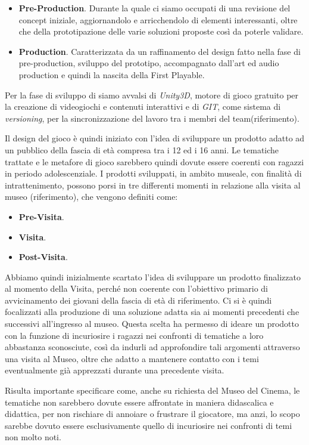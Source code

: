 \begin{itemize}
	\item \textbf{Pre-Production}. Durante la quale ci siamo occupati di una revisione del concept iniziale, aggiornandolo e arricchendolo di elementi interessanti, oltre che della prototipazione delle varie soluzioni proposte così da poterle validare.
	\item \textbf{Production}. Caratterizzata da un raffinamento del design fatto nella fase di pre-production, sviluppo del prototipo, accompagnato dall’art ed audio production e quindi la nascita della First Playable.
\end{itemize}

Per la fase di sviluppo di siamo avvalsi di \textit{Unity3D}, motore di gioco gratuito per la creazione di videogiochi e contenuti interattivi e di \textit{GIT}, come sistema di \textit{versioning}, per la sincronizzazione del lavoro tra i membri del team(riferimento).

Il design del gioco è quindi iniziato con l’idea di sviluppare un prodotto adatto ad un pubblico della fascia di età compresa tra i 12 ed i 16 anni. Le tematiche trattate e le metafore di gioco sarebbero quindi dovute essere coerenti con ragazzi in periodo adolescenziale.
I prodotti sviluppati, in ambito museale, con finalità di intrattenimento, possono porsi in tre differenti momenti in relazione alla visita al museo (riferimento), che vengono definiti come:

\begin{itemize}
	\item \textbf{Pre-Visita}.
	\item \textbf{Visita}.
	\item \textbf{Post-Visita}.
\end{itemize}

Abbiamo quindi inizialmente scartato l’idea di sviluppare un prodotto finalizzato al momento della Visita, perché non coerente con l’obiettivo primario di avvicinamento dei giovani della fascia di età di riferimento. Ci si è quindi focalizzati alla produzione di una soluzione adatta sia ai momenti precedenti che successivi all’ingresso al museo. Questa scelta ha permesso di ideare un prodotto con la funzione di incuriosire i ragazzi nei confronti di tematiche a loro abbastanza sconosciute, così da indurli ad approfondire tali argomenti attraverso una visita al Museo, oltre che adatto a mantenere contatto con i temi eventualmente già apprezzati durante una precedente visita.

Risulta importante specificare come, anche su richiesta del Museo del Cinema, le tematiche non sarebbero dovute essere affrontate in maniera didascalica e didattica, per non rischiare di annoiare o frustrare il giocatore, ma anzi, lo scopo sarebbe dovuto essere esclusivamente quello di incuriosire nei confronti di temi non molto noti.


